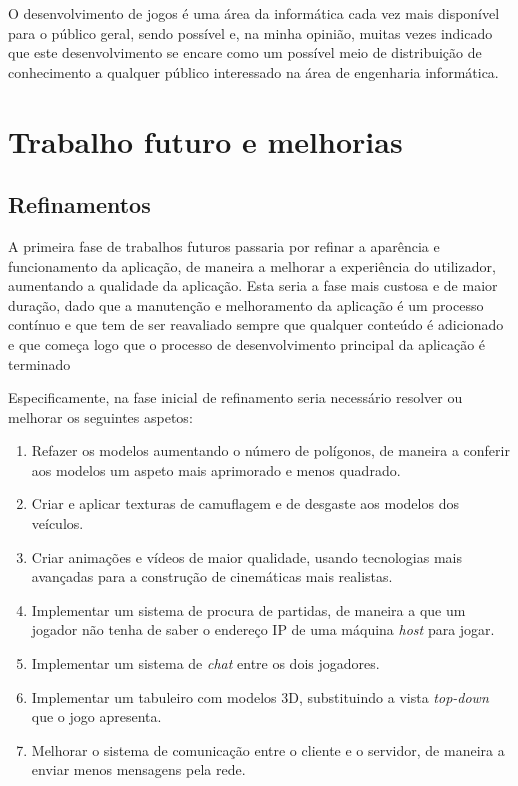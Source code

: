 O desenvolvimento de jogos é uma área da informática cada vez mais disponível para o público geral, sendo possível e, na minha opinião, muitas vezes indicado que este desenvolvimento se encare como um possível meio de distribuição de conhecimento a qualquer público interessado na área de engenharia informática.

\section{Trabalho futuro e melhorias}
\label{chap7:sec:tfm}

\subsection{Refinamentos}
\label{chap7:subsec:EF}
A primeira fase de trabalhos futuros passaria por refinar a aparência e funcionamento da aplicação, de maneira a melhorar a experiência do utilizador, aumentando a qualidade da aplicação.
Esta seria a fase mais custosa e de maior duração, dado que a manutenção e melhoramento da aplicação é um processo contínuo e que tem de ser reavaliado sempre que qualquer conteúdo é adicionado e que começa logo que o processo de desenvolvimento principal da aplicação é terminado

Especificamente, na fase inicial de refinamento seria necessário resolver ou melhorar os seguintes aspetos:
\begin{enumerate}
    \item Refazer os modelos aumentando o número de polígonos, de maneira a conferir aos modelos um aspeto mais aprimorado e menos quadrado.
    \item Criar e aplicar texturas de camuflagem e de desgaste aos modelos dos veículos.
    \item Criar animações e vídeos de maior qualidade, usando tecnologias mais avançadas para a construção de cinemáticas mais realistas.
    \item Implementar um sistema de procura de partidas, de maneira a que um jogador não tenha de saber o endereço \ac{IP} de uma máquina \textit{host} para jogar.
    \item Implementar um sistema de \textit{chat} entre os dois jogadores.
    \item Implementar um tabuleiro com modelos 3D, substituindo a vista \textit{top-down} que o jogo apresenta.
    \item Melhorar o sistema de comunicação entre o cliente e o servidor, de maneira a enviar menos mensagens pela rede. 
\end{enumerate}

